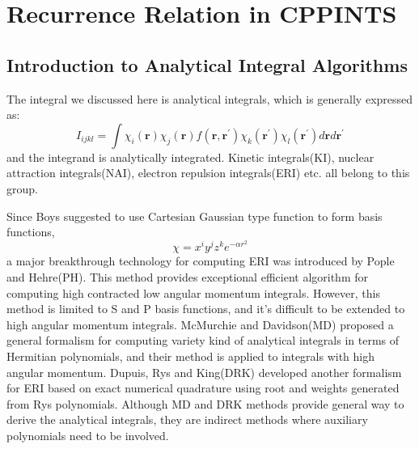 %
% 
%
\chapter{Recurrence Relation in CPPINTS}


\section{Introduction to Analytical Integral Algorithms}
\label{concepts_introduction}

The integral we discussed here is analytical integrals,
which is generally expressed as:
\begin{equation}\label{int_paper:1}
  I_{ijkl} = \int \chi_{i}(\bm{r})\chi_{j}(\bm{r})f(\bm{r},\bm{r^{'}})
\chi_{k}(\bm{r^{'}})\chi_{l}(\bm{r^{'}}) d\bm{r} d\bm{r^{'}}
\end{equation}
and the integrand is analytically integrated. Kinetic integrals(KI),
nuclear attraction integrals(NAI), electron repulsion integrals(ERI) etc. all 
belong to this group. 

Since Boys\cite{SFBoys1950} suggested to use Cartesian Gaussian type function to form 
basis functions,
\begin{equation}\label{int_paper:2}
 \chi = x^{i}y^{j}z^{k}e^{-\alpha r^{2}}
\end{equation}
a major breakthrough technology for computing ERI was introduced by Pople and Hehre(PH)\cite{PH}. 
This method provides exceptional efficient algorithm for computing high contracted 
low angular momentum integrals. However, this method is limited to S and P basis functions, 
and it's difficult to be extended to high angular momentum integrals. McMurchie and 
Davidson(MD)\cite{MD}
proposed a general formalism for computing variety kind of analytical integrals in terms of 
Hermitian polynomials, and their method is applied to integrals with high angular momentum. 
Dupuis, Rys and King(DRK)\cite{DRK1976JCOMP,DRK1976JCP,DRK1983JCOMP} developed another formalism 
for ERI based on exact numerical 
quadrature using root and weights generated from Rys polynomials. Although MD and DRK
methods provide general way to derive the analytical integrals, they are indirect methods where
auxiliary polynomials need to be involved. 

